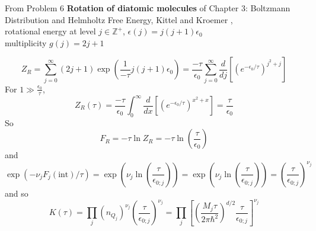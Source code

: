 From Problem 6 \textbf{Rotation of diatomic molecules} of Chapter 3: Boltzmann Distribution and Helmholtz Free Energy, Kittel and Kroemer \cite{CKittelHKroemer1980}, \\
rotational energy at level $j\in \mathbb{Z}^+$, $\epsilon(j) = j(j+1) \epsilon_0$ \\
multiplicity $g(j) = 2j+1$

\[
Z_R = \sum_{j=0}^{\infty} (2j+1)\exp{ \left( \frac{1}{-\tau} j(j+1) \epsilon_0 \right) } = \frac{-\tau}{\epsilon_0} \sum_{j=0}^{\infty} \frac{d}{dj} \left[ (e^{-\epsilon_0 /\tau})^{j^2+j} \right] 
\]
For $1 \gg \frac{\epsilon_0}{\tau}$, 
\[
Z_R(\tau) = \frac{-\tau}{\epsilon_0} \int_0^{\infty} \frac{d}{dx} \left[ (e^{-\epsilon_0/\tau})^{x^2 + x} \right] = \frac{\tau}{\epsilon_0}
\]
So 
\[
F_R = -\tau \ln{Z_R} = -\tau \ln{ \left( \frac{\tau}{\epsilon_0} \right)}
\]
and 
\[
\exp{ (-\nu_j F_j(\text{int})/\tau) } = \exp{ ( \nu_j \ln{ \left( \frac{\tau}{\epsilon_{0;j}} \right) } ) } = \exp{ ( \nu_j \ln{ \left( \frac{\tau}{\epsilon_{0;j}} \right) } ) } = \left( \frac{\tau}{\epsilon_{0;j} } \right)^{\nu_j}
\]
and so 
\[
K(\tau) = \prod_j (n_{Q_j})^{\nu_j} \left( \frac{\tau}{\epsilon_{0;j}} \right)^{\nu_j} = \prod_j \left[ \left( \frac{ M_j \tau }{ 2\pi \hbar^2} \right)^{d/2} \frac{\tau}{ \epsilon_{0;j} } \right]^{\nu_j}
\]





